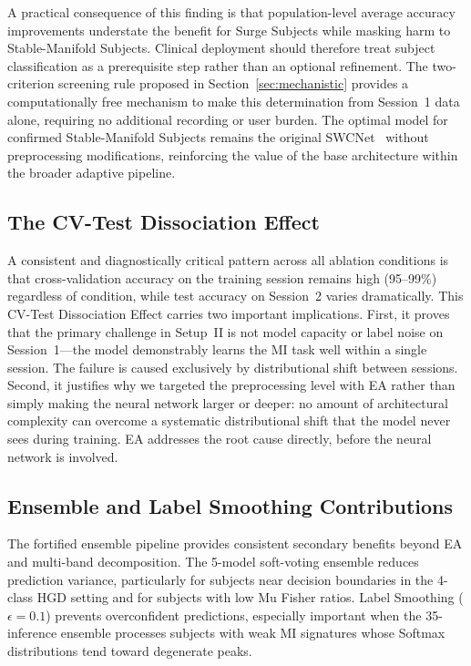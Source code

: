 \documentclass[conference]{IEEEtran}
\begin{document}
A practical consequence of this finding is that population-level average accuracy improvements understate the benefit for Surge Subjects while masking harm to Stable-Manifold Subjects. Clinical deployment should therefore treat subject classification as a prerequisite step rather than an optional refinement. The two-criterion screening rule proposed in Section~\ref{sec:mechanistic} provides a computationally free mechanism to make this determination from Session~1 data alone, requiring no additional recording or user burden. The optimal model for confirmed Stable-Manifold Subjects remains the original SWCNet~\cite{b1} without preprocessing modifications, reinforcing the value of the base architecture within the broader adaptive pipeline.

\subsection{The CV-Test Dissociation Effect}

A consistent and diagnostically critical pattern across all ablation conditions is that cross-validation accuracy on the training session remains high (95--99\%) regardless of condition, while test accuracy on Session~2 varies dramatically. This CV-Test Dissociation Effect carries two important implications. First, it proves that the primary challenge in Setup~II is not model capacity or label noise on Session~1---the model demonstrably learns the MI task well within a single session. The failure is caused exclusively by distributional shift between sessions. Second, it justifies why we targeted the preprocessing level with EA rather than simply making the neural network larger or deeper: no amount of architectural complexity can overcome a systematic distributional shift that the model never sees during training. EA addresses the root cause directly, before the neural network is involved.

\subsection{Ensemble and Label Smoothing Contributions}

The fortified ensemble pipeline provides consistent secondary benefits beyond EA and multi-band decomposition. The 5-model soft-voting ensemble reduces prediction variance, particularly for subjects near decision boundaries in the 4-class HGD setting and for subjects with low Mu Fisher ratios. Label Smoothing ($\epsilon = 0.1$) prevents overconfident predictions, especially important when the 35-inference ensemble processes subjects with weak MI signatures whose Softmax distributions tend toward degenerate peaks.
\end{document}
